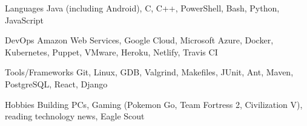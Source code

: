 

\begin{cvskills}


  \cvskill
    {Languages} %
    {Java (including Android), C, C++, PowerShell, Bash, Python, JavaScript} %

  \cvskill
    {DevOps} %
    {Amazon Web Services, Google Cloud, Microsoft Azure, Docker, Kubernetes, Puppet, VMware, Heroku, Netlify, Travis CI} %
    
  \cvskill
    {Tools/Frameworks} %
    {Git, Linux, GDB, Valgrind, Makefiles, JUnit, Ant, Maven, PostgreSQL, React, Django} %

  \cvskill
  {Hobbies} %
  {Building PCs, Gaming (Pokemon Go, Team Fortress 2, Civilization V), reading technology news, Eagle Scout} %

\end{cvskills}
